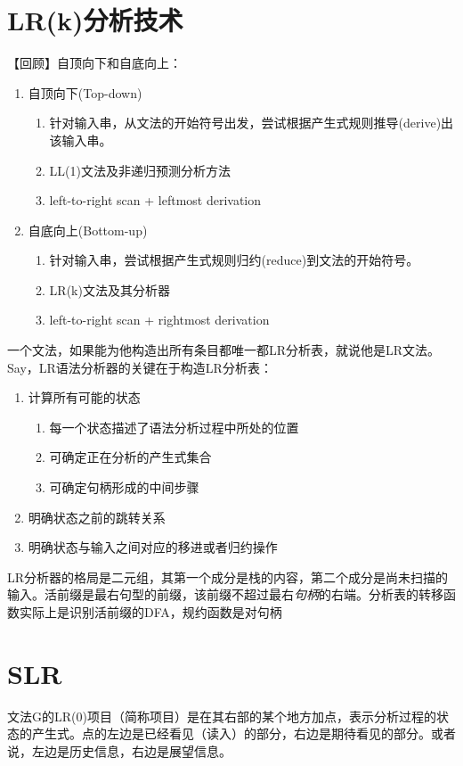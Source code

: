 \documentclass[]{report}
\begin{document}
	\section{LR(k)分析技术}
	【回顾】自顶向下和自底向上：\par
	\begin{enumerate}
		\item 自顶向下(Top-down)
		\begin{enumerate}
			\item 针对输入串，从文法的开始符号出发，尝试根据产生式规则推导(derive)出该输入串。
			\item LL(1)文法及非递归预测分析方法
			\item left-to-right scan + leftmost derivation
		\end{enumerate}
		\item 自底向上(Bottom-up)
		\begin{enumerate}
			\item 针对输入串，尝试根据产生式规则归约(reduce)到文法的开始符号。
			\item LR(k)文法及其分析器
			\item left-to-right scan + rightmost derivation
		\end{enumerate}
	\end{enumerate}\par
	一个文法，如果能为他构造出所有条目都唯一都LR分析表，就说他是LR文法。Say，LR语法分析器的关键在于构造LR分析表：\begin{enumerate}
		\item 计算所有可能的状态
		\begin{enumerate}
			\item 每一个状态描述了语法分析过程中所处的位置
			\item 可确定正在分析的产生式集合
			\item 可确定句柄形成的中间步骤
		\end{enumerate}
		\item 明确状态之前的跳转关系
		\item 明确状态与输入之间对应的移进或者归约操作
	\end{enumerate}\par
	LR分析器的格局是二元组，其第一个成分是栈的内容，第二个成分是尚未扫描的输入。活前缀是最右句型的前缀，该前缀不超过最右\textit{句柄}的右端。分析表的转移函数实际上是识别活前缀的DFA，规约函数是对句柄
	\section{SLR}
	文法G的LR(0)项目（简称项目）是在其右部的某个地方加点，表示分析过程的状态的产生式。点的左边是已经看见（读入）的部分，右边是期待看见的部分。或者说，左边是历史信息，右边是展望信息。\par
\end{document}
